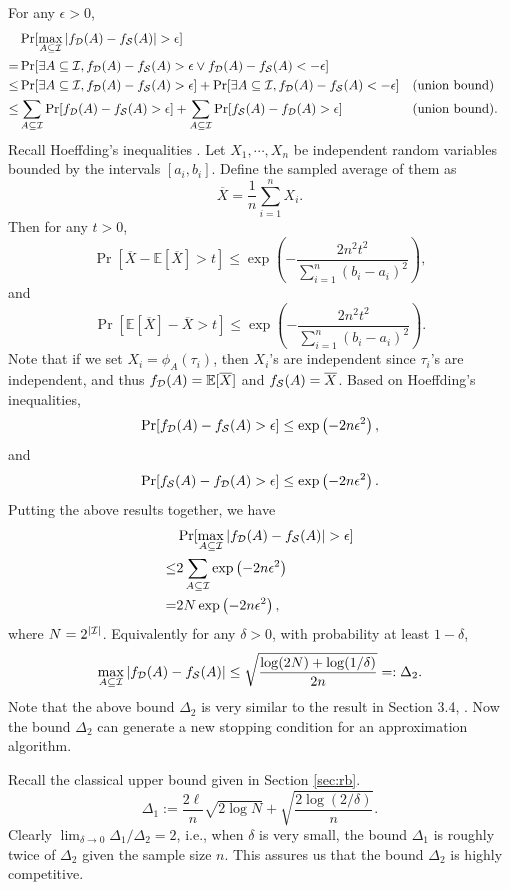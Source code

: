 \documentclass{article}
\begin{document}
For any $\epsilon > 0$,
$$\begin{aligned}
& \Pr[\max_{A\subseteq\I}|f_\D(A)-f_\Smp(A)|>\epsilon] \\
= & \Pr[\exists A\subseteq\I, f_\D(A)-f_\Smp(A)>\epsilon \vee f_\D(A)-f_\Smp(A)<-\epsilon] \\
\leq & \Pr[\exists A\subseteq\I, f_\D(A)-f_\Smp(A)>\epsilon] +\Pr[\exists A\subseteq\I, f_\D(A)-f_\Smp(A)<-\epsilon] && \textrm{(union bound)}\\
\leq & \sum_{A\subseteq\I} \Pr[f_\D(A)-f_\Smp(A)>\epsilon] + \sum_{A\subseteq\I} \Pr[f_\Smp(A)-f_\D(A)>\epsilon] && \textrm{(union bound)}.
\end{aligned}$$
Recall Hoeffding's inequalities \cite{H63}. Let $X_1, \cdots, X_n$ be independent random variables bounded by the intervals $[a_i, b_i]$. Define the sampled average of them as
$$\overline{X} = \frac{1}{n}\sum_{i=1}^n X_i.$$
Then for any $t>0$,
$$\Pr[\overline{X} - \mathbb{E}[\overline{X}] > t] \leq \exp\left(-\frac{2n^2t^2}{\sum_{i=1}^n (b_i-a_i)^2}\right),$$
and
$$\Pr[\mathbb{E}[\overline{X}] - \overline{X} > t] \leq \exp\left(-\frac{2n^2t^2}{\sum_{i=1}^n (b_i-a_i)^2}\right).$$
Note that if we set $X_i = \phi_A(\tau_i)$, then $X_i$'s are independent since $\tau_i$'s are independent, and thus $f_{\mathcal{D}}(A) = \mathbb{E}[\overline{X}]$ and $f_{\mathcal{S}}(A) = \overline{X}$. Based on Hoeffding's inequalities, 
$$\Pr[f_{\mathcal{D}}(A) - f_{\mathcal{S}}(A) > \epsilon] \leq \exp\left(-2n\epsilon^2\right),$$
and
$$\Pr[f_{\mathcal{S}}(A) - f_{\mathcal{D}}(A) > \epsilon] \leq \exp\left(-2n\epsilon^2\right).$$
Putting the above results together, we have
$$\begin{aligned}
& \Pr[\max_{A\subseteq\I}|f_\D(A)-f_\Smp(A)|>\epsilon] \\
\leq & 2\sum_{A\subseteq\I} \exp\left(-2n\epsilon^2\right) \\
= & 2N \exp\left(-2n\epsilon^2\right),
\end{aligned}$$
where $N = 2^{|\mathcal{I}|}$. 
Equivalently for any $\delta>0$, with probability at least $1-\delta$,
$$\max_{A\subseteq\mathcal{I}}|f_{\mathcal{D}}(A)-f_{\mathcal{S}}(A)| \leq \sqrt{\frac{\log(2N) + \log(1/\delta)}{2n}} =: \Delta_2.$$
Note that the above bound $\Delta_2$ is very similar to the result in Section 3.4, \cite{BBL04}. Now the bound $\Delta_2$ can generate a new stopping condition for an approximation algorithm.

Recall the classical upper bound given in Section \ref{sec:rb}.
$$\Delta_1 := \frac{2\ell}{n}\sqrt{2\log N} + \sqrt{\frac{2\log(2/\delta)}{n}}.$$
Clearly $\lim_{\delta\to 0}\Delta_1/\Delta_2 = 2$, i.e., when $\delta$ is very small, the bound $\Delta_1$ is roughly twice of $\Delta_2$ given the sample size $n$.
This assures us that the bound $\Delta_2$ is highly competitive.
\end{document}
